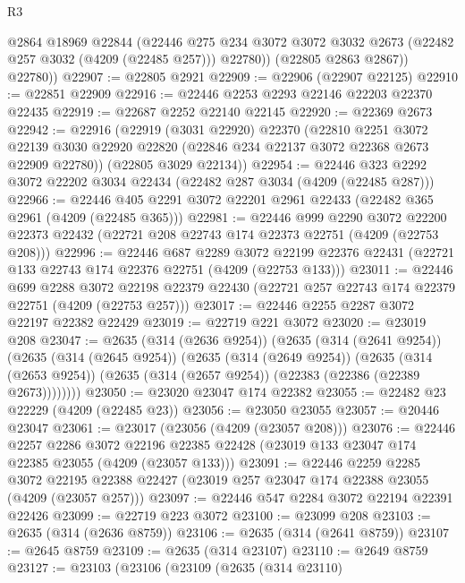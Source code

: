 \begin{lexlean}{R3}
\begin{coremodule}
            @2864
            @18969
            @22844
            (@22446
              @275
              @234
              @3072
              @3072
              @3032
              @2673
              (@22482 @257 @3032 (@4209 (@22485 @257)))
              @22780))
          (@22805 @2863 @2867))
        @22780))
@22907 := @22805 @2921
@22909 := @22906 (@22907 @22125)
@22910 := @22851 @22909
@22916 := @22446 @2253 @2293 @22146 @22203 @22370 @22435
@22919 := @22687 @2252 @22140 @22145
@22920 := @22369 @2673
@22942 := @22916
    (@22919
      (@3031 @22920)
      @22370
      (@22810
        @2251
        @3072
        @22139
        @3030
        @22920
        @22820
        (@22846 @234 @22137 @3072 @22368 @2673 @22909 @22780))
      (@22805 @3029 @22134))
@22954 := @22446 @323 @2292 @3072 @22202 @3034 @22434 (@22482 @287 @3034 (@4209 (@22485 @287)))
@22966 := @22446 @405 @2291 @3072 @22201 @2961 @22433 (@22482 @365 @2961 (@4209 (@22485 @365)))
@22981 := @22446
    @999
    @2290
    @3072
    @22200
    @22373
    @22432
    (@22721 @208 @22743 @174 @22373 @22751 (@4209 (@22753 @208)))
@22996 := @22446
    @687
    @2289
    @3072
    @22199
    @22376
    @22431
    (@22721 @133 @22743 @174 @22376 @22751 (@4209 (@22753 @133)))
@23011 := @22446
    @699
    @2288
    @3072
    @22198
    @22379
    @22430
    (@22721 @257 @22743 @174 @22379 @22751 (@4209 (@22753 @257)))
@23017 := @22446 @2255 @2287 @3072 @22197 @22382 @22429
@23019 := @22719 @221 @3072
@23020 := @23019 @208
@23047 := @2635
    (@314 (@2636 @9254))
    (@2635
      (@314 (@2641 @9254))
      (@2635
        (@314 (@2645 @9254))
        (@2635
          (@314 (@2649 @9254))
          (@2635
            (@314 (@2653 @9254))
            (@2635 (@314 (@2657 @9254)) (@22383 (@22386 (@22389 @2673))))))))
@23050 := @23020 @23047 @174 @22382
@23055 := @22482 @23 @22229 (@4209 (@22485 @23))
@23056 := @23050 @23055
@23057 := @20446 @23047
@23061 := @23017 (@23056 (@4209 (@23057 @208)))
@23076 := @22446
    @2257
    @2286
    @3072
    @22196
    @22385
    @22428
    (@23019 @133 @23047 @174 @22385 @23055 (@4209 (@23057 @133)))
@23091 := @22446
    @2259
    @2285
    @3072
    @22195
    @22388
    @22427
    (@23019 @257 @23047 @174 @22388 @23055 (@4209 (@23057 @257)))
@23097 := @22446 @547 @2284 @3072 @22194 @22391 @22426
@23099 := @22719 @223 @3072
@23100 := @23099 @208
@23103 := @2635 (@314 (@2636 @8759))
@23106 := @2635 (@314 (@2641 @8759))
@23107 := @2645 @8759
@23109 := @2635 (@314 @23107)
@23110 := @2649 @8759
@23127 := @23103
    (@23106
      (@23109
        (@2635
          (@314 @23110)

\end{coremodule}
\end{lexlean}
